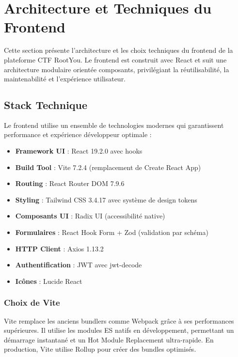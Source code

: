 \section{Architecture et Techniques du Frontend}

Cette section présente l'architecture et les choix techniques du frontend de la plateforme CTF RootYou. Le frontend est construit avec React et suit une architecture modulaire orientée composants, privilégiant la réutilisabilité, la maintenabilité et l'expérience utilisateur.

\subsection{Stack Technique}

Le frontend utilise un ensemble de technologies modernes qui garantissent performance et expérience développeur optimale :

\begin{tcolorbox}[colback=blue!5!white,colframe=blue!75!black,title=Technologies Principales]
\begin{itemize}
    \item \textbf{Framework UI} : React 19.2.0 avec hooks
    \item \textbf{Build Tool} : Vite 7.2.4 (remplacement de Create React App)
    \item \textbf{Routing} : React Router DOM 7.9.6
    \item \textbf{Styling} : Tailwind CSS 3.4.17 avec système de design tokens
    \item \textbf{Composants UI} : Radix UI (accessibilité native)
    \item \textbf{Formulaires} : React Hook Form + Zod (validation par schéma)
    \item \textbf{HTTP Client} : Axios 1.13.2
    \item \textbf{Authentification} : JWT avec jwt-decode
    \item \textbf{Icônes} : Lucide React
\end{itemize}
\end{tcolorbox}

\subsubsection{Choix de Vite}

Vite remplace les anciens bundlers comme Webpack grâce à ses performances supérieures. Il utilise les modules ES natifs en développement, permettant un démarrage instantané et un Hot Module Replacement ultra-rapide. En production, Vite utilise Rollup pour créer des bundles optimisés.

